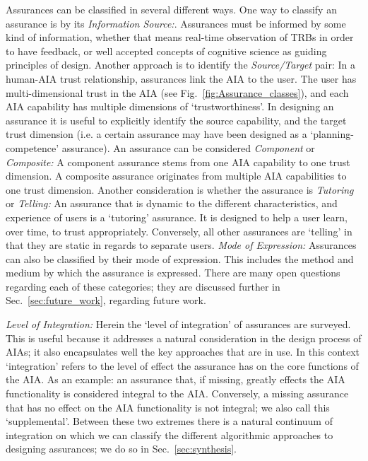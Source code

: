 Assurances can be classified in several different ways. One way to classify an assurance is by its \emph{Information Source:}. Assurances must be informed by some kind of information, whether that means real-time observation of TRBs in order to have feedback, or well accepted concepts of cognitive science as guiding principles of design.
Another approach is to identify the \emph{Source/Target} pair: In a human-AIA trust relationship, assurances link the AIA to the user. The user has multi-dimensional trust in the AIA (see Fig.~\ref{fig:Assurance_classes}), and each AIA capability has multiple dimensions of `trustworthiness'. In designing an assurance it is useful to explicitly identify the source capability, and the target trust dimension (i.e. a certain assurance may have been designed as a `planning-competence' assurance).
An assurance can be considered \emph{Component} or \emph{Composite:} A component assurance stems from one AIA capability to one trust dimension. A composite assurance originates from multiple AIA capabilities to one trust dimension.
Another consideration is whether the assurance is \emph{Tutoring} or \emph{Telling:} An assurance that is dynamic to the different characteristics, and experience of users is a `tutoring' assurance. It is designed to help a user learn, over time, to trust appropriately. Conversely, all other assurances are `telling' in that they are static in regards to separate users.
\emph{Mode of Expression:} Assurances can also be classified by their mode of expression. This includes the method and medium by which the assurance is expressed.
There are many open questions regarding each of these categories; they are discussed further in Sec.~\ref{sec:future_work}, regarding future work.

\emph{Level of Integration:} Herein the `level of integration' of assurances are surveyed. This is useful because it addresses a natural consideration in the design process of AIAs; it also encapsulates well the key approaches that are in use. In this context `integration' refers to the level of effect the assurance has on the core functions of the AIA. As an example: an assurance that, if missing, greatly effects the AIA functionality is considered integral to the AIA. Conversely, a missing assurance that has no effect on the AIA functionality is not integral; we also call this `supplemental'. Between these two extremes there is a natural continuum of integration on which we can classify the different algorithmic approaches to designing assurances; we do so in Sec.~\ref{sec:synthesis}.

